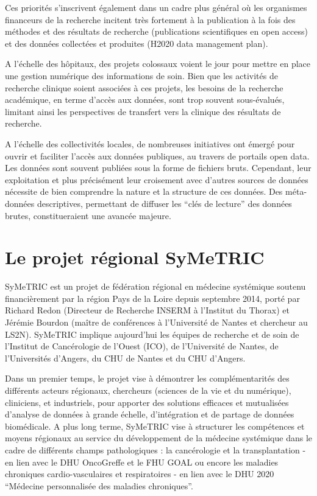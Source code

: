 \documentclass[a4paper,11pt]{article}
\theoremstyle{definition}
\begin{document}
Ces priorités s'inscrivent également dans un cadre plus général où les organismes financeurs de la recherche incitent très fortement à la publication à la fois des méthodes et des résultats de recherche (publications scientifiques en open access) et des données collectées et produites (H2020 data management plan).

A l’échelle des hôpitaux, des projets colossaux voient le jour pour mettre en place une gestion numérique des informations de soin. Bien que les activités de recherche clinique soient associées à ces projets, les besoins de la recherche académique, en terme d’accès aux données, sont trop souvent sous-évalués, limitant ainsi les perspectives de transfert vers la clinique des résultats de recherche.

A l’échelle des collectivités locales, de nombreuses initiatives ont émergé pour ouvrir et faciliter l’accès aux données publiques, au travers de portails open data. Les données sont souvent publiées sous la forme de fichiers bruts. Cependant, leur exploitation et plus précisément leur croisement avec d’autres sources de données nécessite de bien comprendre la nature et la structure de ces données. Des méta-données descriptives, permettant de diffuser les “clés de lecture” des données brutes, constitueraient une avancée majeure.

\section{Le projet régional SyMeTRIC}
SyMeTRIC est un projet de fédération régional en médecine systémique soutenu financièrement par la région Pays de la Loire depuis septembre 2014, porté par Richard Redon (Directeur de Recherche INSERM à l’Institut du Thorax) et Jérémie Bourdon (maître de conférences à l’Université de Nantes et chercheur au LS2N). SyMeTRIC implique aujourd'hui les équipes de recherche et de soin de l’Institut de Cancérologie de l’Ouest (ICO), de l’Université de Nantes, de l’Universités d’Angers, du CHU de Nantes et du CHU d’Angers. 

Dans un premier temps, le projet vise à démontrer les complémentarités des différents acteurs régionaux, chercheurs (sciences de la vie et du numérique), cliniciens, et industriels, pour apporter des solutions efficaces et mutualisées d'analyse de données à grande échelle, d'intégration et de partage de données biomédicale. A plus long terme, SyMeTRIC vise à structurer les compétences et moyens régionaux au service du développement de la médecine systémique dans le cadre de différents champs pathologiques : la cancérologie et la transplantation - en lien avec le DHU OncoGreffe et le FHU GOAL ou encore les maladies chroniques cardio-vasculaires et respiratoires - en lien avec le DHU 2020 ``Médecine personnalisée des maladies chroniques''. 
\end{document}
